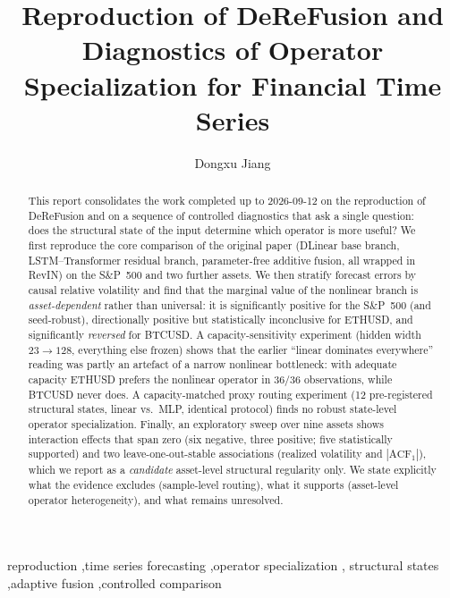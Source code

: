 \documentclass[preprint,12pt]{elsarticle}
\begin{document}
\begin{frontmatter}

\title{Reproduction of DeReFusion and Diagnostics of Operator
Specialization for Financial Time Series}

\author[nwpu]{Dongxu Jiang}

\begin{abstract}
This report consolidates the work completed up to 2026-09-12 on the reproduction of
DeReFusion and on a sequence of controlled diagnostics that ask a single question: does the
structural state of the input determine which operator is more useful? We first reproduce the
core comparison of the original paper (DLinear base branch, LSTM--Transformer residual branch,
parameter-free additive fusion, all wrapped in RevIN) on the S\&P~500 and two further assets.
We then stratify forecast errors by causal relative volatility and find that the marginal value
of the nonlinear branch is \emph{asset-dependent} rather than universal: it is significantly
positive for the S\&P~500 (and seed-robust), directionally positive but statistically
inconclusive for ETHUSD, and significantly \emph{reversed} for BTCUSD. A capacity-sensitivity
experiment (hidden width $23\!\to\!128$, everything else frozen) shows that the earlier
``linear dominates everywhere'' reading was partly an artefact of a narrow nonlinear bottleneck:
with adequate capacity ETHUSD prefers the nonlinear operator in $36/36$ observations, while
BTCUSD never does. A capacity-matched proxy routing experiment (12 pre-registered structural
states, linear vs.\ MLP, identical protocol) finds no robust state-level operator specialization.
Finally, an exploratory sweep over nine assets shows interaction effects that span zero
(six negative, three positive; five statistically supported) and two leave-one-out-stable
associations (realized volatility and $|\mathrm{ACF}_1|$), which we report as a
\emph{candidate} asset-level structural regularity only. We state explicitly what the evidence
excludes (sample-level routing), what it supports (asset-level operator heterogeneity), and what
remains unresolved.
\end{abstract}

\begin{keyword}
reproduction \sep time series forecasting \sep operator specialization \sep
structural states \sep adaptive fusion \sep controlled comparison
\end{keyword}

\end{frontmatter}
\end{document}
